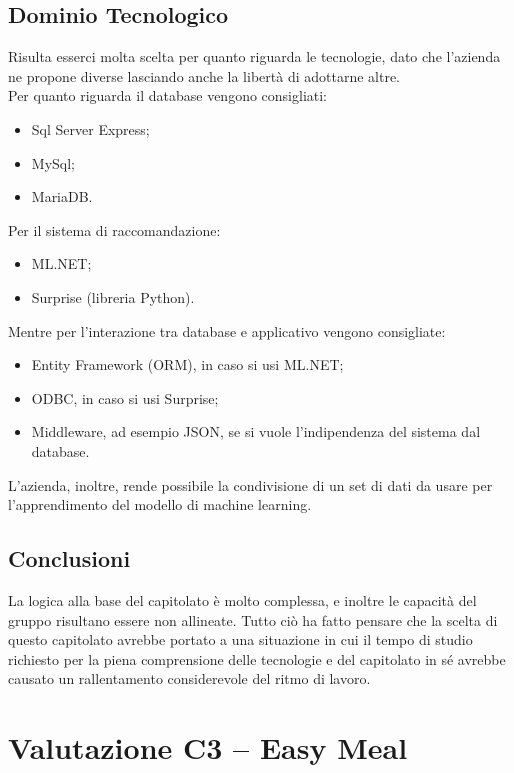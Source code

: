 \documentclass[a4paper, twoside]{article}
\begin{document}
        \subsection{Dominio Tecnologico}
        Risulta esserci molta scelta per quanto riguarda le tecnologie, dato che l'azienda ne propone diverse lasciando anche la libertà di adottarne altre.\\
        Per quanto riguarda il database vengono consigliati:
        \begin{itemize}
            \item Sql Server Express;
            \item MySql;
            \item MariaDB.
        \end{itemize}
        Per il sistema di raccomandazione:
        \begin{itemize}
            \item ML.NET;
            \item Surprise (libreria Python).
        \end{itemize}
        Mentre per l'interazione tra database e applicativo vengono consigliate:
        \begin{itemize}
            \item Entity Framework (ORM), in caso si usi ML.NET;
            \item ODBC, in caso si usi Surprise;
            \item Middleware, ad esempio JSON, se si vuole l'indipendenza del sistema dal database.
        \end{itemize}
        L'azienda, inoltre, rende possibile la condivisione di un set di dati da usare per l'apprendimento del modello di machine learning.
        \subsection{Conclusioni}
        La logica alla base del capitolato è molto complessa, e inoltre le capacità del gruppo risultano essere non allineate. Tutto ciò ha fatto pensare che la scelta di questo capitolato avrebbe portato a una situazione in cui il tempo di studio richiesto per la piena comprensione delle tecnologie e del capitolato in sé avrebbe causato un rallentamento considerevole del ritmo di lavoro.

    \section{Valutazione C3 -- Easy Meal}
\end{document}
